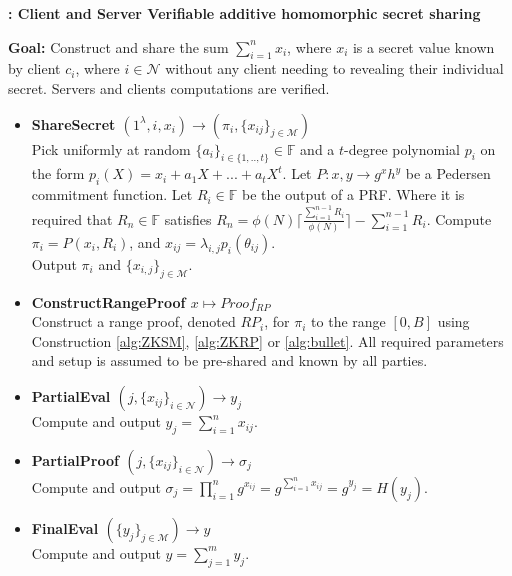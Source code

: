 \begin{algorithm}
\caption{\textbf{: Client and Server Verifiable additive homomorphic secret sharing}}

\textbf{Goal:} Construct and share the sum $\sum_{i=1}^n x_i$, where $x_i$ is a secret value known by client $c_i$, where $i\in\mathcal{N}$ without any client needing to revealing their individual secret. Servers and clients computations are verified. 
\vspace{2pt}
\hline
\vspace{2pt}
\begin{itemize}
  \item\textbf{ShareSecret $(1^\lambda,i,x_i)\xrightarrow[]{}(\pi_i,\{x_{ij}\}_{j\in\mathcal{M}})$}\\
Pick uniformly at random $\{a_i\}_{i\in\{1,..,t\}}\in\mathds{F}$ and a $t$-degree polynomial $p_i$ on the form $p_i(X) = x_i + a_1X+...+a_tX^t$.
Let $P : x,y \to g^xh^y$ be a Pedersen commitment function.
 Let $R_i\in\mathds{F}$ be the output of a PRF. Where it is required that  $R_n\in \mathds{F}$  satisfies
$R_n = \phi(N)\lceil \frac{\sum_{i=1}^{n-1}R_i}{\phi(N)}\rceil- \sum_{i=1}^{n-1}R_i $. Compute $\pi_i = P(x_i,R_i)$, and $x_{ij}=\lambda_{i,j}p_i(\theta_{ij})$. \\
Output $\pi_i$ and $\{x_{i,j}\}_{j\in\mathcal{M}}$.
\item\textbf{ConstructRangeProof $x \mapsto Proof_{RP}$}\\
Construct a range proof, denoted $RP_i$, for  $\pi_i$ to the  range $[0,B]$ using Construction \ref{alg:ZKSM}, \ref{alg:ZKRP} or \ref{alg:bullet}. All required  parameters and setup is assumed to be pre-shared and known by all parties.
\item\textbf{PartialEval $(j,\{x_{ij}\}_{i\in\mathcal{N}})\xrightarrow[]{}y_j$}\\
Compute and output $y_j = \sum_{i=1}^n x_{ij}$.

\item\textbf{PartialProof $(j,\{x_{ij}\}_{i\in\mathcal{N}})\xrightarrow[]{}\sigma_j$}\\
Compute and output $\sigma_j = \prod_{i=1}^n g^{x_{ij}} =  g^{\sum_{i=1}^n x_{ij}}= g^{y_j}=H(y_j)$.

\item\textbf{FinalEval $(\{y_j\}_{j\in\mathcal{M}})\xrightarrow[]{}y$}\\
Compute and output $y = \sum_{j=1}^m y_{j}$.


\end{itemize}
\end{algorithm}
